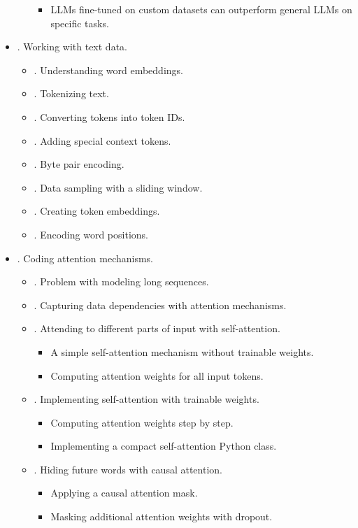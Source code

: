 \documentclass{article}
\begin{document}
\begin{itemize}
\begin{itemize}
\begin{itemize}
			\item LLMs fine-tuned on custom datasets can outperform general LLMs on specific tasks.
		\end{itemize}
	\end{itemize}
	\item {. Working with text data.}
	\begin{itemize}
		\item {. Understanding word embeddings.}
		\item {. Tokenizing text.}
		\item {. Converting tokens into token IDs.}
		\item {. Adding special context tokens.}
		\item {. Byte pair encoding.}
		\item {. Data sampling with a sliding window.}
		\item {. Creating token embeddings.}
		\item {. Encoding word positions.}
	\end{itemize}
	\item {. Coding attention mechanisms.}
	\begin{itemize}
		\item {. Problem with modeling long sequences.}
		\item {. Capturing data dependencies with attention mechanisms.}
		\item {. Attending to different parts of input with self-attention.}
		\begin{itemize}
			\item {\sf A simple self-attention mechanism without trainable weights.}
			\item {\sf Computing attention weights for all input tokens.}
		\end{itemize}
		\item {. Implementing self-attention with trainable weights.}
		\begin{itemize}
			\item {\sf Computing attention weights step by step.}
			\item {\sf Implementing a compact self-attention Python class.}
		\end{itemize}
		\item {. Hiding future words with causal attention.}
		\begin{itemize}
			\item {\sf Applying a causal attention mask.}
			\item {\sf Masking additional attention weights with dropout.}

\end{itemize}
\end{itemize}
\end{itemize}
\end{document}
